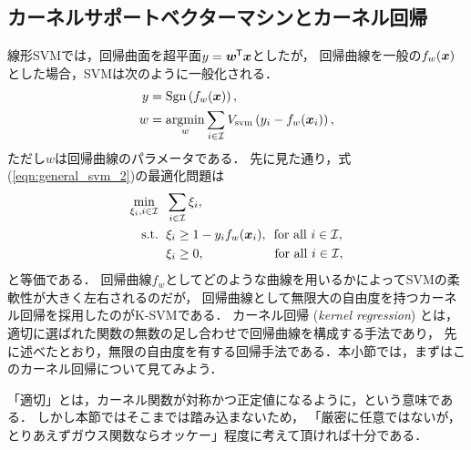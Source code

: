 %

\subsection{カーネルサポートベクターマシンとカーネル回帰}

線形SVMでは，回帰曲面を超平面$y = \boldsymbol{w}^{\mkern-1.5mu\mathsf{T}}\boldsymbol{x}$としたが，
回帰曲線を一般の$f_w(\boldsymbol{x})$とした場合，SVMは次のように一般化される．
\begin{align}
    \label{eqn:general_svm_1}
    y &= \operatorname*{Sgn} \left( f_w(\boldsymbol{x}) \right), \\
    \label{eqn:general_svm_2}
    w &= \operatorname*{argmin}_{w} \sum_{i \in \mathcal{I}} V_{\mathrm{svm}}
    \left( y_i - f_w(\boldsymbol{x}_i) \right),
\end{align}
ただし$w$は回帰曲線のパラメータである．
先に見た通り，式(\ref{eqn:general_svm_2})の最適化問題は
\begin{equation}\begin{split}
    \label{eqn:general_svm_3}
    \min_{\xi_i, i \in \mathcal{I}} \hspace{6pt}& \sum_{i \in \mathcal{I}} \xi_i, \\
    \text{s.t.} \hspace{6pt}
    & \xi_i \geq 1 - y_i f_w(\boldsymbol{x}_i), \hspace{ 5pt} \text{for all $i \in \mathcal{I}$}, \\
    & \xi_i \geq 0,                     \hspace{55pt} \text{for all $i \in \mathcal{I}$},
\end{split}\end{equation}
と等価である．
回帰曲線$f_w$としてどのような曲線を用いるかによってSVMの柔軟性が大きく左右されるのだが，
回帰曲線として無限大の自由度を持つカーネル回帰を採用したのがK-SVMである．
カーネル回帰 (\textit{kernel regression}) とは，適切に選ばれた関数の無数の足し合わせで回帰曲線を構成する手法であり，
先に述べたとおり，無限の自由度を有する回帰手法である．本小節では，まずはこのカーネル回帰について見てみよう．

\begin{note}
「適切」とは，カーネル関数が対称かつ正定値になるように，という意味である．
しかし本節ではそこまでは踏み込まないため，
「厳密に任意ではないが，とりあえずガウス関数ならオッケー」程度に考えて頂ければ十分である．
\end{note}


